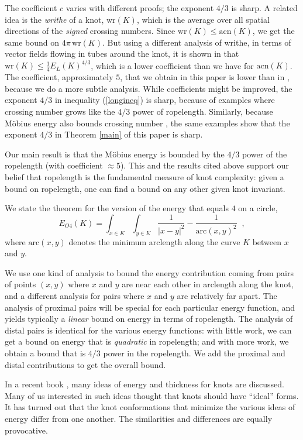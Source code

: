 \documentclass{elsart}
\def\E{E}
\begin{document}
The coefficient $c$ varies with different proofs; the
exponent $4/3$ is sharp.  A related idea is the
{\it writhe} of a knot,
$\mathrm{wr}(K)$,   which is the average over all spatial
directions of the {\it signed} crossing numbers.  Since
$\mathrm{wr}(K) \leq \mathrm{acn}(K)$, we get the same
bound on 
$4\pi\, \mathrm{wr}(K)$.  But using a different analysis
of writhe, in terms of vector fields flowing in tubes
around the knot, it is shown in  \cite{CDG} that
$\mathrm{wr}(K) \leq {\frac14}
\E_L(K)^{4/3}$, which is a lower coefficient than we have
for $\mathrm{acn}(K)$. The
coefficient, approximately $5$, that we obtain in this
paper is lower than in
\cite{BS3}, because we do a more subtle analysis. While
coefficients might be improved, the exponent
$4/3$ in  inequality (\ref{longineq}) is sharp,
 because of examples \cite{B3,CKS} where crossing number
grows like the
$4/3$ power of ropelength. Similarly, because
M\"obius energy also bounds crossing number
\cite{FHW}, the same examples
 show that the  exponent $4/3$ in Theorem
\ref{main} of this paper is sharp.

Our main result  is that the M\"obius energy
 is bounded by  the $4/3$
power of the ropelength (with coefficient
$\approx 5$).   This and the results cited above
support our belief that ropelength is the fundamental
measure of knot complexity: given a bound on ropelength,
one can find a bound on any other given knot invariant.

We state the theorem for the version of the energy that
equals $4$ on a circle, $$\E_{O4}(K) = \int\nolimits_{x \in
K}\int\nolimits_{y \in K} {  {\frac1{|x-y|^2}} - {  
{\frac1{\mathrm{arc}(x,y)^2}}   }}\;\;,$$  where
$\mathrm{arc}(x,y)$ denotes the minimum arclength along
the curve
$K$ between $x$ and $y$.  

We use one kind of analysis
to bound the energy contribution coming from pairs of
points $(x,y)$ where
$x$ and $y$ are near each other in arclength along the
knot, and a different analysis for pairs where $x$ and $y$
are relatively far apart.  The analysis of proximal pairs
will be special for each particular energy function, and
yields typically a {\it linear} bound on energy in terms
of ropelength.  The analysis of distal pairs is identical
for the various energy functions: with little work, we
can get a bound on energy that is {\it quadratic} in
ropelength; and with more work, we obtain a bound that is
$4/3$ power in the ropelength. We add the proximal and
distal contributions to get the overall bound.


In a recent book \cite{SKK}, many ideas of energy and
thickness for knots are discussed.  Many of us interested
in such ideas thought that knots should have ``ideal''
forms.  It has turned out that the knot conformations
that minimize the various ideas of energy differ from one
another.  The  similarities and differences are equally
provocative.
\end{document}
